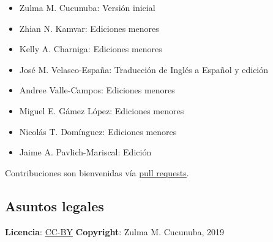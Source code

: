 \documentclass[
]{article}
\providecommand{\tightlist}{%
  \setlength{\itemsep}{0pt}\setlength{\parskip}{0pt}}
\begin{document}
\begin{itemize}
\tightlist
\item
  Zulma M. Cucunuba: Versión inicial
\item
  Zhian N. Kamvar: Ediciones menores
\item
  Kelly A. Charniga: Ediciones menores
\item
  José M. Velasco-España: Traducción de Inglés a Español y edición
\item
  Andree Valle-Campos: Ediciones menores
\item
  Miguel E. Gámez López: Ediciones menores
\item
  Nicolás T. Domínguez: Ediciones menores
\item
  Jaime A. Pavlich-Mariscal: Edición
\end{itemize}

Contribuciones son bienvenidas vía
\href{https://github.com/reconhub/learn/pulls}{pull requests}.

\subsection{Asuntos legales}\label{asuntos-legales}

\textbf{Licencia}:
\href{https://creativecommons.org/licenses/by/3.0/}{CC-BY}
\textbf{Copyright}: Zulma M. Cucunuba, 2019
\end{document}
